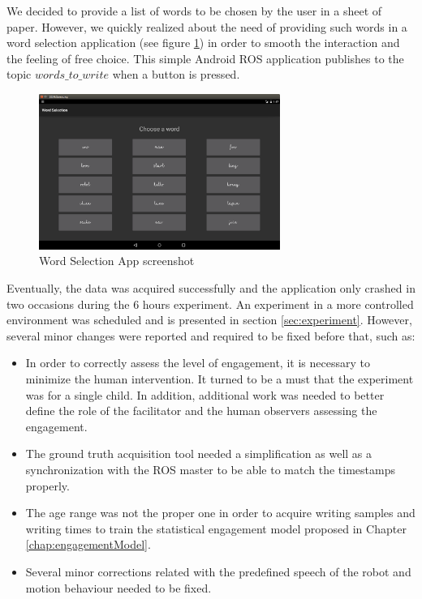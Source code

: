 We decided to provide a list of words to be chosen by the user in a sheet of paper. However, we quickly realized about the need of providing such words in a word selection application (see figure \ref{fig:wordSelector}) in order to smooth the interaction and the feeling of free choice. This simple Android ROS application publishes to the topic $ words\_to\_write $ when a button is pressed.

\begin{figure}[h!]
        \centering
        \includegraphics[width=0.7\textwidth]{figures/wordSelector.png}
        \caption{Word Selection App screenshot}
        \label{fig:wordSelector}
\end{figure}

Eventually, the data was acquired successfully and the application only crashed in two occasions during the 6 hours experiment. An experiment in a more controlled environment was scheduled and is presented in section \ref{sec:experiment}. However, several minor changes were reported and required to be fixed before that, such as:

\begin{itemize}
\item In order to correctly assess the level of engagement, it is necessary to minimize the human intervention. It turned to be a must that the experiment was for a single child. In addition, additional work was needed to better define the role of the facilitator and the human observers assessing the engagement.
\item The ground truth acquisition tool needed a simplification as well as a synchronization with the ROS master to be able to match the timestamps properly.
\item The age range was not the proper one in order to acquire writing samples and writing times to train the statistical engagement model proposed in Chapter \ref{chap:engagementModel}.
\item Several minor corrections related with the predefined speech of the robot and motion behaviour needed to be fixed.

\end{itemize}

